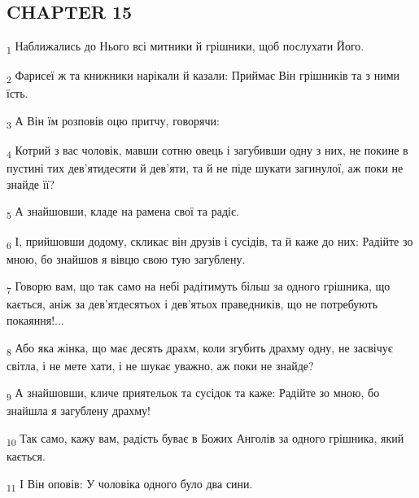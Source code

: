 \subsection{CHAPTER 15}
\begin{tcolorbox}
\textsubscript{1} Наближались до Нього всі митники й грішники, щоб послухати Його.
\end{tcolorbox}
\begin{tcolorbox}
\textsubscript{2} Фарисеї ж та книжники нарікали й казали: Приймає Він грішників та з ними їсть.
\end{tcolorbox}
\begin{tcolorbox}
\textsubscript{3} А Він їм розповів оцю притчу, говорячи:
\end{tcolorbox}
\begin{tcolorbox}
\textsubscript{4} Котрий з вас чоловік, мавши сотню овець і загубивши одну з них, не покине в пустині тих дев'ятидесяти й дев'яти, та й не піде шукати загинулої, аж поки не знайде її?
\end{tcolorbox}
\begin{tcolorbox}
\textsubscript{5} А знайшовши, кладе на рамена свої та радіє.
\end{tcolorbox}
\begin{tcolorbox}
\textsubscript{6} І, прийшовши додому, скликає він друзів і сусідів, та й каже до них: Радійте зо мною, бо знайшов я вівцю свою тую загублену.
\end{tcolorbox}
\begin{tcolorbox}
\textsubscript{7} Говорю вам, що так само на небі радітимуть більш за одного грішника, що кається, аніж за дев'ятдесятьох і дев'ятьох праведників, що не потребують покаяння!...
\end{tcolorbox}
\begin{tcolorbox}
\textsubscript{8} Або яка жінка, що має десять драхм, коли згубить драхму одну, не засвічує світла, і не мете хати, і не шукає уважно, аж поки не знайде?
\end{tcolorbox}
\begin{tcolorbox}
\textsubscript{9} А знайшовши, кличе приятельок та сусідок та каже: Радійте зо мною, бо знайшла я загублену драхму!
\end{tcolorbox}
\begin{tcolorbox}
\textsubscript{10} Так само, кажу вам, радість буває в Божих Анголів за одного грішника, який кається.
\end{tcolorbox}
\begin{tcolorbox}
\textsubscript{11} І Він оповів: У чоловіка одного було два сини.
\end{tcolorbox}
